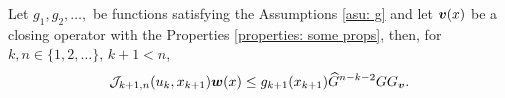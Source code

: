 \begin{lem}\label{lem: rh bnd}
	Let \(g_1, g_2, \dots,\) be functions satisfying the Assumptions \ref{asu: g} and let \({\boldsymbol v}(x)\) be a closing operator with the Properties \ref{properties: some props}, then, for \(k,n\in\{1,2,\dots\},\, k+1 < n\), 
	\begin{align*}
            	\mathcal J_{k+1,n}(u_k,x_{k+1})  {\boldsymbol w}(x) \leq  g_{k+1}(x_{k+1})\widehat G^{n-k-2} G G_{\boldsymbol v}.
	\end{align*}
\end{lem}
